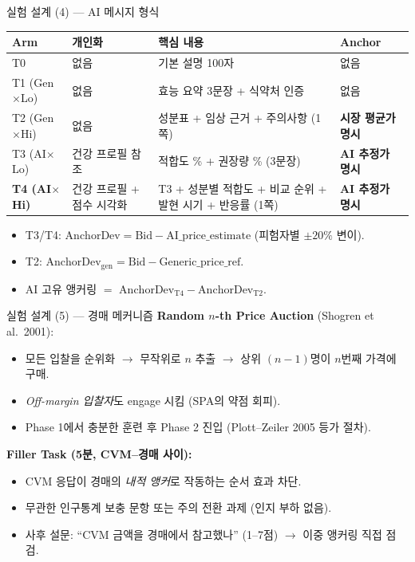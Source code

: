 \documentclass[aspectratio=169]{beamer}
\begin{document}
\begin{frame}{실험 설계 (4) --- AI 메시지 형식}
  \footnotesize
  \begin{tabular}{l|p{4cm}|p{5cm}|p{1.6cm}}
    \hline
    \textbf{Arm} & \textbf{개인화} & \textbf{핵심 내용} & \textbf{Anchor} \\
    \hline
    T0 & 없음 & 기본 설명 100자 & 없음 \\
    T1 (Gen$\times$Lo) & 없음 & 효능 요약 3문장 + 식약처 인증 & 없음 \\
    T2 (Gen$\times$Hi) & 없음 & 성분표 + 임상 근거 + 주의사항 (1쪽) & \textbf{시장 평균가 명시} \\
    T3 (AI$\times$Lo) & 건강 프로필 참조 & 적합도 \% + 권장량 \% (3문장) & \textbf{AI 추정가 명시} \\
    \textbf{T4 (AI$\times$Hi)} & 건강 프로필 + 점수 시각화 & T3 + 성분별 적합도 + 비교 순위 + 발현 시기 + 반응률 (1쪽) & \textbf{AI 추정가 명시} \\
    \hline
  \end{tabular}

  \vspace{0.6em}
  \small
  \begin{itemize}
    \item T3/T4: $\mathrm{AnchorDev} = \mathrm{Bid} - \mathrm{AI\_price\_estimate}$ (피험자별 $\pm 20\%$ 변이).
    \item T2: $\mathrm{AnchorDev}_{\text{gen}} = \mathrm{Bid} - \mathrm{Generic\_price\_ref}$.
    \item AI 고유 앵커링 $=$ $\mathrm{AnchorDev}_{\text{T4}} - \mathrm{AnchorDev}_{\text{T2}}$.
  \end{itemize}
\end{frame}

\begin{frame}{실험 설계 (5) --- 경매 메커니즘}
  \textbf{Random $n$-th Price Auction} (Shogren et al.\ 2001):
  \begin{itemize}
    \item 모든 입찰을 순위화 $\rightarrow$ 무작위로 $n$ 추출 $\rightarrow$ 상위 $(n-1)$명이 $n$번째 가격에 구매.
    \item \emph{Off-margin 입찰자}도 engage 시킴 (SPA의 약점 회피).
    \item Phase 1에서 충분한 훈련 후 Phase 2 진입 (Plott--Zeiler 2005 등가 절차).
  \end{itemize}

  \vspace{0.5em}
  \textbf{Filler Task (5분, CVM--경매 사이):}
  \begin{itemize}
    \item CVM 응답이 경매의 \emph{내적 앵커}로 작동하는 순서 효과 차단.
    \item 무관한 인구통계 보충 문항 또는 주의 전환 과제 (인지 부하 없음).
    \item 사후 설문: ``CVM 금액을 경매에서 참고했나'' (1--7점) $\rightarrow$ 이중 앵커링 직접 점검.
  \end{itemize}
\end{frame}
\end{document}
